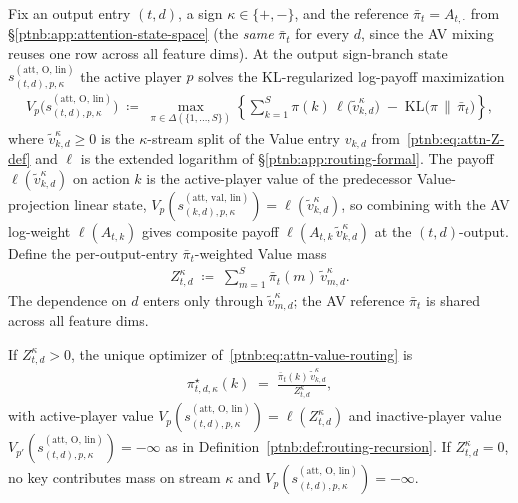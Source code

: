 Fix an output entry $(t, d)$, a sign $\kappa \in \{+,-\}$, and the reference $\bar\pi_t =
    A_{t,\cdot}$ from \S\ref{ptnb:app:attention-state-space} (the \emph{same} $\bar\pi_t$ for every $d$,
since the AV mixing reuses one row across all feature dims). At the output sign-branch state
$s_{(t,d),p,\kappa}^{(\mathrm{att},\,\mathrm{O},\,\mathrm{lin})}$ the active player $p$ solves the
KL-regularized log-payoff maximization
\begin{align}\label{ptnb:eq:attn-value-routing}
    V_p\!\bigl(s_{(t,d),p,\kappa}^{(\mathrm{att},\,\mathrm{O},\,\mathrm{lin})}\bigr)
    \;\coloneqq\;
    \max_{\pi \in \Delta(\{1,\dots,S\})}
    \left\{
    \sum_{k=1}^S \pi(k)\, \ell\!\bigl(\tilde{v}_{k,d}^\kappa\bigr)
    \;-\;
    \mathrm{KL}\!\bigl(\pi \,\|\, \bar\pi_t\bigr)
    \right\},
\end{align}
where $\tilde{v}_{k,d}^\kappa \ge 0$ is the $\kappa$-stream split of the Value entry $v_{k,d}$
from~\eqref{ptnb:eq:attn-Z-def} and $\ell$ is the extended logarithm of \S\ref{ptnb:app:routing-formal}. The
payoff $\ell(\tilde{v}_{k,d}^\kappa)$ on action $k$ is the active-player value of the predecessor
Value-projection linear state,
$V_p(s_{(k,d),p,\kappa}^{(\mathrm{att},\,\mathrm{val},\,\mathrm{lin})}) =
    \ell(\tilde{v}_{k,d}^\kappa)$, so combining with the AV log-weight $\ell(A_{t,k})$ gives composite
payoff $\ell(A_{t,k}\, \tilde{v}_{k,d}^\kappa)$ at the $(t,d)$-output. Define the per-output-entry
$\bar\pi_t$-weighted Value mass
\begin{align}\label{ptnb:eq:attn-z-def}
    Z_{t,d}^\kappa \;\coloneqq\; \sum_{m=1}^S \bar\pi_t(m)\, \tilde{v}_{m,d}^\kappa.
\end{align}
The dependence on $d$ enters only through $\tilde{v}_{m,d}^\kappa$; the AV reference $\bar\pi_t$ is
shared across all feature dims.

\begin{proposition}\label{ptnb:prop:attn-value-policy}
If $Z_{t,d}^\kappa > 0$, the unique optimizer of~\eqref{ptnb:eq:attn-value-routing} is
\begin{align}\label{ptnb:eq:attn-value-policy}
    \pi_{t,d,\kappa}^\star(k)
    \;=\;
    \frac{\bar\pi_t(k)\, \tilde{v}_{k,d}^\kappa}{Z_{t,d}^\kappa},
\end{align}
with active-player value $V_p(s_{(t,d),p,\kappa}^{(\mathrm{att},\,\mathrm{O},\,\mathrm{lin})}) =
    \ell(Z_{t,d}^\kappa)$ and inactive-player value
$V_{p'}(s_{(t,d),p,\kappa}^{(\mathrm{att},\,\mathrm{O},\,\mathrm{lin})}) = -\infty$ as in
Definition~\ref{ptnb:def:routing-recursion}. If $Z_{t,d}^\kappa = 0$, no key contributes mass on stream
$\kappa$ and $V_p(s_{(t,d),p,\kappa}^{(\mathrm{att},\,\mathrm{O},\,\mathrm{lin})}) = -\infty$.
\hfill{}
\end{proposition}

